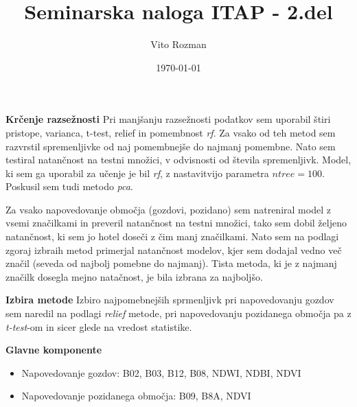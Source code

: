 \documentclass[12pt]{article}
\title{Seminarska naloga ITAP - 2.del}
\begin{document}
    
\author{Vito Rozman}
\date{\today}
\maketitle


\textbf{Krčenje razsežnosti} 
Pri manjšanju razsežnosti podatkov sem uporabil štiri pristope, varianca, t-test, 
relief in pomembnost \emph{rf}. Za vsako od teh metod sem razvrstil spremenljivke od naj 
pomembnejše do najmanj pomembne. Nato sem testiral natančnost na testni množici, 
v odvisnosti od števila spremenljivk. Model, ki sem ga uporabil za učenje je bil \emph{rf}, 
z nastavitvijo parametra $ntree=100$. Poskusil sem tudi metodo \emph{pca}.

Za vsako napovedovanje območja (gozdovi, pozidano) sem natreniral model z vsemi značilkami in preveril 
natančnost na testni množici, tako sem dobil željeno natančnost, ki sem jo hotel doseči z čim manj
značilkami. Nato sem na podlagi zgoraj izbraih metod primerjal natančnost 
modelov, kjer sem dodajal vedno več značil (seveda od najbolj pomebne do najmanj). Tista metoda, ki 
je z najmanj značilk dosegla mejno natačnost, je bila izbrana za najboljšo.

\textbf{Izbira metode}
Izbiro najpomebnejših sprmenljivk pri napovedovanju gozdov sem naredil na podlagi 
\emph{relief} metode, pri napovedovanju pozidanega območja pa z \emph{t-test}-om in sicer
glede na vredost statistike.




\vspace{0.5cm}

\textbf{Glavne komponente} 
\begin{itemize}
    \item Napovedovanje gozdov: B02, B03, B12, B08, NDWI, NDBI, NDVI
    \item Napovedovanje pozidanega območja: B09, B8A, NDVI 
\end{itemize}
\end{document}

